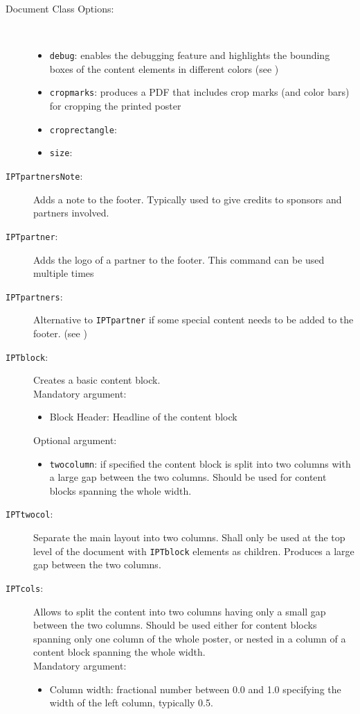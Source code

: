 \begin{description}
	\item[Document Class Options:]~
		\begin{itemize}
			\item \texttt{debug}: enables the debugging feature and highlights the bounding boxes of the content elements in different colors (see )
			\item \texttt{cropmarks}: produces a PDF that includes crop marks (and color bars) for cropping the printed poster
			\item \texttt{croprectangle}:
			\item \texttt{size}:
		\end{itemize}
	\item[\texttt{IPTpartnersNote}:]
		Adds a note to the footer. Typically used to give credits to sponsors and partners involved.
	\item[\texttt{IPTpartner}:]
		Adds the logo of a partner to the footer. This command can be used multiple times
	\item[\texttt{IPTpartners}:]
		Alternative to \texttt{\bs{}IPTpartner} if some special content needs to be added to the footer. (see )
	\item[\texttt{IPTblock}:] Creates a basic content block. \\
		Mandatory argument: 
		\begin{itemize}
			\item Block Header: Headline of the content block
		\end{itemize}
		Optional argument:
		\begin{itemize}
			\item \texttt{twocolumn}: if specified the content block is split into two columns with a large gap between the two columns. Should be used for content blocks spanning the whole width.
		\end{itemize}

	\item[\texttt{IPTtwocol}:] Separate the main layout into two columns. Shall only be used at the top level of the document with \texttt{IPTblock} elements as children. Produces a large gap between the two columns.

	\item[\texttt{IPTcols}:] Allows to split the content into two columns having only a small gap between the two columns. Should be used either for content blocks spanning only one column of the whole poster, or nested in a column of a content block spanning the whole width.\\
	Mandatory argument:
		\begin{itemize}
			\item Column width: fractional number between 0.0 and 1.0 specifying the width of the left column, typically 0.5.
		\end{itemize}


\end{description}
